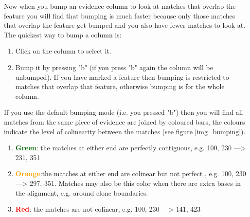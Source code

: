 \documentclass[letterpaper]{article}
\begin{document}
Now when you bump an evidence column to look at matches that overlap the feature you will find that bumping is much faster because only those matches that overlap the feature get bumped and you also have fewer matches to look at. The quickest way to bump a column is:
\begin{enumerate}
\item Click on the column to select it.
\item Bump it by pressing "b" (if you press "b" again the column will be unbumped). If you have marked a feature then bumping is restricted to matches that overlap that feature, otherwise bumping is for the whole column.
\end{enumerate}

If you use the default bumping mode (i.e. you pressed "b") then you will find all matches from the same piece of evidence are joined by coloured bars, the colours indicate the level of colinearity between the matches (see figure \ref{img_bumping}).
\begin{enumerate}
\item \textcolor{darkgreen}{\textbf{Green}}: the matches at either end are perfectly contiguous, e.g. 100, 230 ---> 231, 351
\item \textcolor{orange}{\textbf{Orange}}:the matches at either end are colinear but not perfect , e.g. 100, 230 ---> 297, 351. Matches may also be this color when there are extra bases in the alignment, e.g. around clone boundaries.
\item \textcolor{red}{\textbf{Red}}: the matches are not colinear, e.g. 100, 230 ---> 141, 423
\end{enumerate}
\end{document}
